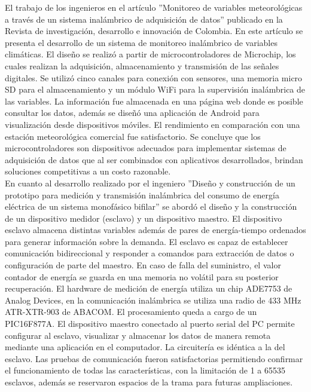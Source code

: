 \documentclass[12pt,letterpaper]{article}
\begin{document}
El trabajo de los ingenieros \cite{RUIZ-AYALA2018} en el artículo ”Monitoreo de variables meteorológicas a través de un sistema inalámbrico de adquisición de datos” publicado en la Revista de investigación, desarrollo e innovación de Colombia. En este artículo se presenta el desarrollo de un sistema de monitoreo inalámbrico de variables climáticas. El diseño se realizó a partir de microcontroladores de Microchip, los cuales realizan la adquisición, almacenamiento y transmisión de las señales digitales. Se utilizó cinco canales para conexión con sensores, una memoria micro SD para el almacenamiento y un módulo WiFi para la supervisión inalámbrica de las variables. La información fue almacenada en una página web donde es posible consultar los datos, además se diseñó una aplicación de Android para visualización desde dispositivos móviles. El rendimiento en comparación con una estación meteorológica comercial fue satisfactorio. Se concluye que los microcontroladores son dispositivos adecuados para implementar sistemas de adquisición de datos que al ser combinados con aplicativos desarrollados, brindan soluciones competitivas a un costo razonable.\\


En cuanto al desarrollo realizado por el ingeniero \cite{DA2006} ”Diseño y construcción de un prototipo para medición y transmisión inalámbrica del consumo de energía eléctrica de un sistema monofásico bifilar” se abordó el diseño y la construcción de un dispositivo medidor (esclavo) y un dispositivo maestro. El dispositivo esclavo almacena distintas variables además de pares de energía-tiempo ordenados para generar información sobre la demanda. El esclavo es capaz de establecer comunicación bidireccional y responder a comandos para extracción de datos o configuración de parte del maestro. En caso de falla del suministro, el valor contador de energía se guarda en una memoria no volátil para su posterior recuperación. El hardware de medición de energía utiliza un chip ADE7753 de Analog Devices, en la comunicación inalámbrica se utiliza una radio de 433 MHz ATR-XTR-903 de ABACOM. El procesamiento queda a cargo de un PIC16F877A. El dispositivo maestro conectado al puerto serial del PC permite configurar al esclavo, visualizar y almacenar los datos de manera remota mediante una aplicación en el computador. La circuitería es idéntica a la del esclavo. Las pruebas de comunicación fueron satisfactorias permitiendo confirmar el funcionamiento de todas las características, con la limitación de 1 a 65535 esclavos, además se reservaron espacios de la trama para futuras ampliaciones.\\
\end{document}
